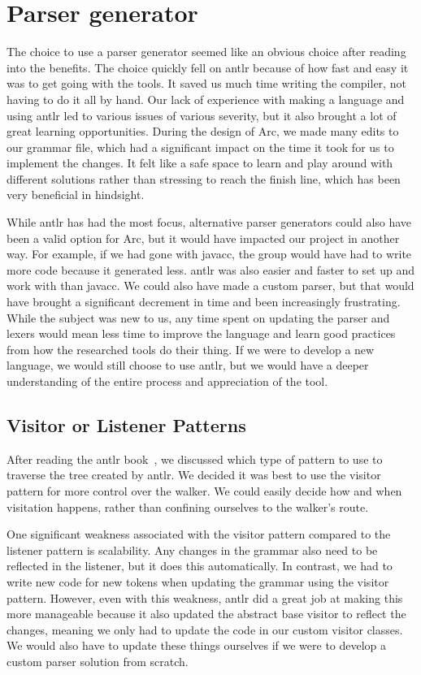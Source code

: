 \section{Parser generator}\label{sec:discussion_parserGenerator}

The choice to use a parser generator seemed like an obvious choice after reading into the benefits. The choice quickly fell on \gls{antlr} because of how fast and easy it was to get going with the tools. It saved us much time writing the compiler, not having to do it all by hand. Our lack of experience with making a language and using \gls{antlr} led to various issues of various severity, but it also brought a lot of great learning opportunities. During the design of Arc, we made many edits to our grammar file, which had a significant impact on the time it took for us to implement the changes. It felt like a safe space to learn and play around with different solutions rather than stressing to reach the finish line, which has been very beneficial in hindsight.

While \gls{antlr} has had the most focus, alternative parser generators could also have been a valid option for Arc, but it would have impacted our project in another way. For example, if we had gone with \gls{javacc}, the group would have had to write more code because it generated less. \gls{antlr} was also easier and faster to set up and work with than \gls{javacc}. We could also have made a custom parser, but that would have brought a significant decrement in time and been increasingly frustrating. While the subject was new to us, any time spent on updating the parser and lexers would mean less time to improve the language and learn good practices from how the researched tools do their thing. If we were to develop a new language, we would still choose to use \gls{antlr}, but we would have a deeper understanding of the entire process and appreciation of the tool.

\subsection{Visitor or Listener Patterns}

After reading the \gls{antlr} book~\cite{Parr2014}, we discussed which type of pattern to use to traverse the tree created by \gls{antlr}. We decided it was best to use the visitor pattern for more control over the walker. We could easily decide how and when visitation happens, rather than confining ourselves to the walker's route.

One significant weakness associated with the visitor pattern compared to the listener pattern is scalability. Any changes in the grammar also need to be reflected in the listener, but it does this automatically. In contrast, we had to write new code for new tokens when updating the grammar using the visitor pattern. However, even with this weakness, \gls{antlr} did a great job at making this more manageable because it also updated the abstract base visitor to reflect the changes, meaning we only had to update the code in our custom visitor classes. We would also have to update these things ourselves if we were to develop a custom parser solution from scratch.